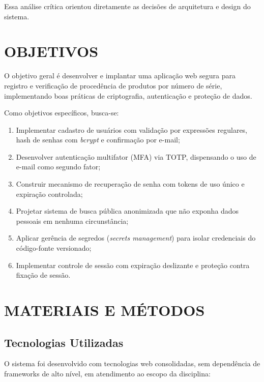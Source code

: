 \documentclass[12pt,a4paper]{article}
\begin{document}
Essa análise crítica orientou diretamente as decisões de arquitetura e design do sistema.

\section{OBJETIVOS}

O objetivo geral é desenvolver e implantar uma aplicação web segura para registro e verificação de procedência de produtos por número de série, implementando boas práticas de criptografia, autenticação e proteção de dados.

Como objetivos específicos, busca-se:

\begin{enumerate}
  \item Implementar cadastro de usuários com validação por expressões regulares, hash de senhas com \textit{bcrypt} e confirmação por e-mail;
  \item Desenvolver autenticação multifator (MFA) via TOTP, dispensando o uso de e-mail como segundo fator;
  \item Construir mecanismo de recuperação de senha com tokens de uso único e expiração controlada;
  \item Projetar sistema de busca pública anonimizada que não exponha dados pessoais em nenhuma circunstância;
  \item Aplicar gerência de segredos (\textit{secrets management}) para isolar credenciais do código-fonte versionado;
  \item Implementar controle de sessão com expiração deslizante e proteção contra fixação de sessão.
\end{enumerate}

\section{MATERIAIS E MÉTODOS}

\subsection{Tecnologias Utilizadas}

O sistema foi desenvolvido com tecnologias web consolidadas, sem dependência de frameworks de alto nível, em atendimento ao escopo da disciplina:
\end{document}
